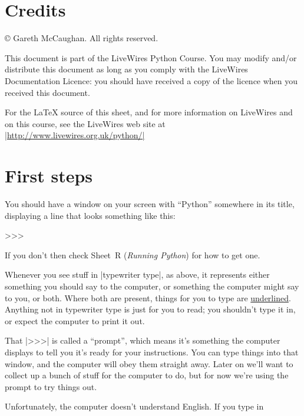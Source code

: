\documentclass[pdftex]{wsheet}
\author{Gareth McCaughan}
\date{Revision \RCSRevision, \RCSDate}
\begin{document}
\section{Credits}

\copyright{} Gareth McCaughan. All rights reserved.

This document is part of the LiveWires Python Course. You may
modify and/or distribute this document as long as you comply with the
LiveWires Documentation Licence: you should have received a copy of the
licence when you received this document.

For the \LaTeX{} source of this sheet, and for more information on
LiveWires and on this course, see the LiveWires web site at
\href{http://www.livewires.org.uk/python/}{|http://www.livewires.org.uk/python/|}

\section{First steps}
You should have a window on your screen with ``Python'' somewhere
in its title, displaying a line that looks something like this:

\begin{interaction}
>>>
\end{interaction}

If you don't then check Sheet~R (\emph{Running Python}) for how 
to get one.

\begin{note}
          Whenever you see stuff in |typewriter type|, as above, it 
          represents either something you should say to the computer, 
          or something the computer might say to you, or both.
          Where both are present, things for you to type are 
          \uline{underlined}.
          Anything not in typewriter type is just for you to read;
          you shouldn't type it in, or expect the computer to
          print it out.
\end{note}
That |>>>| is called a ``prompt'', which means it's something the 
computer displays to tell you it's ready for your instructions. You 
can type things into that window, and the computer will obey them 
straight away. Later on we'll want to collect up a bunch of stuff for 
the computer to do, but for now we're using the prompt to try things 
out.

Unfortunately, the computer doesn't understand English. If you
type in
\end{document}
